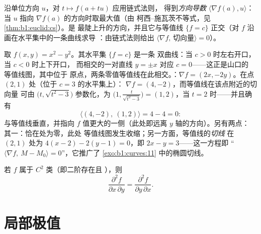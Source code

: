 \begin{remark}[梯度的解读]
沿单位方向 $u$，对 $t \mapsto f(a + tu)$ 应用链式法则，
得到\emph{方向导数} $\langle \nabla f(a),
u\rangle$：当 $u$ 指向 $\nabla f(a)$ 的方向时取最大值（由
柯西--施瓦茨不等式，见\cref{thm:b1:euclid:cs}）。是
最陡上升的方向，并且它与等值线
$\{f = c\}$ 正交（对 $f$ 沿画在水平集中的一条曲线求导
：由链式法则给出 $\langle\nabla f,\,
\text{切向量}\rangle = 0$）。
\end{remark}

\begin{example}[同一函数的等值线与梯度]
\label{ex:b1:multivar:levelcurves}
取 $f(x, y) = x^2 - y^2$。其水平集 $\{f = c\}$ 是一条
双曲线：当 $c > 0$ 时左右开口，当 $c < 0$ 时上下开口，
而相交的一对直线 $y = \pm x$ 对应 $c = 0$——这正是山口的
等值线图，其中位于
原点，两条零值等值线在此相交。：$\nabla
f = (2x, -2y)$。在点 $(2, 1)$ 处（位于 $c = 3$ 的水平集上）：
$\nabla f = (4, -2)$，而等值线在该点附近的切向量
可由 $\bigl(t,
\sqrt{t^2 - 3}\bigr)$ 参数化，为 $\bigl(1, \frac{t}{\sqrt{t^2 -
3}}\bigr) = (1, 2)$，当 $t = 2$ 时——并且确有
\[
\langle (4, -2),\ (1, 2)\rangle = 4 - 4 = 0 :
\]
与等值线垂直，并指向
$f$ 值更大的一侧（此处即远离 $y$ 轴的方向）。另有两点：
其一：恰在处为零，此处
等值线图发生收缩；另一方面，等值线的\emph{切线}
在 $(2,1)$ 处为 $4(x - 2) - 2(y - 1) = 0$，即 $2x -
y = 3$——这一方程即 “$\langle \nabla f,\ M - M_0\rangle =
0$”，它推广了
\cref{exo:b1:curves:11} 中的椭圆切线。
\end{example}

\begin{theorem}[施瓦茨定理]\label{thm:b1:multivar:schwarz}
若 $f$ 属于 $C^2$ 类（即二阶存在且
），则
\[
\frac{\partial^2 f}{\partial x\,\partial y}
= \frac{\partial^2 f}{\partial y\,\partial x} .
\]
\end{theorem}
\admitted

\section{局部极值}

